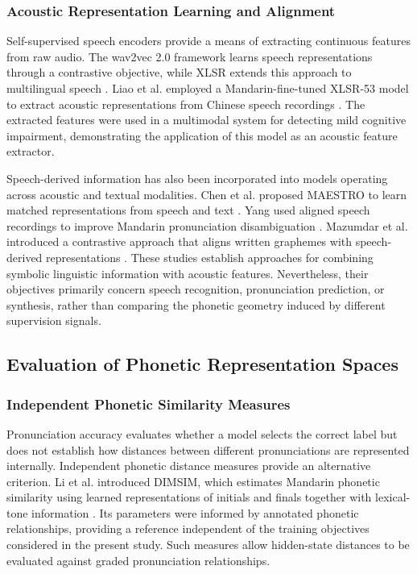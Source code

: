 \subsubsection{Acoustic Representation Learning and Alignment}
\label{sec:lr-acoustic-alignment}

Self-supervised speech encoders provide a means of extracting continuous
features from raw audio. The wav2vec 2.0 framework learns speech representations
through a contrastive objective, while XLSR extends this approach to
multilingual speech \cite{ref_wav2vec2,ref_xlsr2021}. Liao et al. employed a
Mandarin-fine-tuned XLSR-53 model to extract acoustic representations from
Chinese speech recordings \cite{ref_liao2026}. The extracted features were used
in a multimodal system for detecting mild cognitive impairment, demonstrating
the application of this model as an acoustic feature extractor.

Speech-derived information has also been incorporated into models operating
across acoustic and textual modalities. Chen et al. proposed MAESTRO to
learn matched representations from speech and text \cite{ref_maestro2022}. Yang
used aligned speech recordings to improve Mandarin pronunciation disambiguation
\cite{ref_g2pa2024}. Mazumdar et al. introduced a contrastive approach that
aligns written graphemes with speech-derived representations
\cite{ref_sparcle2026}. These studies establish approaches for combining
symbolic linguistic information with acoustic features. Nevertheless, their
objectives primarily concern speech recognition, pronunciation prediction, or
synthesis, rather than comparing the phonetic geometry induced by different
supervision signals.


\subsection{Evaluation of Phonetic Representation Spaces}
\label{sec:lr-evaluation}

\subsubsection{Independent Phonetic Similarity Measures}
\label{sec:lr-distance}

Pronunciation accuracy evaluates whether a model selects the correct label but
does not establish how distances between different pronunciations are
represented internally. Independent phonetic distance measures provide an
alternative criterion. Li et al. introduced DIMSIM, which estimates Mandarin
phonetic similarity using learned representations of initials and finals
together with lexical-tone information \cite{ref_dimsim}. Its parameters were
informed by annotated phonetic relationships, providing a reference independent
of the training objectives considered in the present study. Such measures allow
hidden-state distances to be evaluated against graded pronunciation
relationships.

